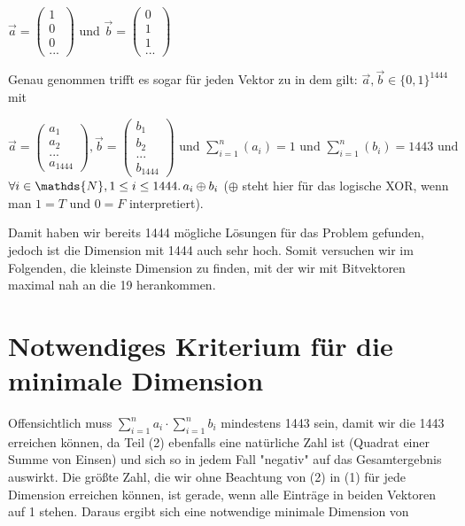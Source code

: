 \documentclass{article}
\newcommand{\sumN}[2]{\ensuremath{\sum\limits_{#1}^{#2}}}
\newcommand{\inN}[1]{\ensuremath{#1 \in \mathds{N}}}
\newcommand{\faExp}[2]{\ensuremath{\forall #1 \ldotp #2}}
\begin{document}
$\vec a = \begin{pmatrix}1\\0\\0\\...\end{pmatrix}$ und $\vec b = \begin{pmatrix}0\\1\\1\\...\end{pmatrix}$

Genau genommen trifft es sogar für jeden Vektor zu in dem gilt: $\vec a,\vec b \in \{0,1\}^{1444}$ mit

$\vec a = \begin{pmatrix}a_1\\a_2\\...\\a_{1444}\end{pmatrix}, \vec b = \begin{pmatrix}b_1\\b_2\\...\\b_{1444}\end{pmatrix} \text{ und } \sumN{i=1}{n}(a_i) = 1 \text{ und } \sumN{i=1}{n}(b_i) = 1443 \text{ und }$\\ $\faExp{\inN{i}, 1\leq i \leq 1444}{a_i \oplus b_i}$ ($\oplus$ steht hier für das logische XOR, wenn man $1=T$ und $0=F$ interpretiert).

Damit haben wir bereits 1444 mögliche Lösungen für das Problem gefunden, jedoch ist die Dimension mit 1444 auch sehr hoch. Somit versuchen wir im Folgenden, die kleinste Dimension zu finden, mit der wir mit Bitvektoren maximal nah an die 19 herankommen.

\section{Notwendiges Kriterium für die minimale Dimension}

Offensichtlich muss $\sumN{i=1}{n}a_i \cdot \sumN{i=1}{n}b_i$ mindestens 1443 sein, damit wir die 1443 erreichen können, da Teil (2) ebenfalls eine natürliche Zahl ist (Quadrat einer Summe von Einsen) und sich so in jedem Fall "negativ" auf das Gesamtergebnis auswirkt. Die größte Zahl, die wir ohne Beachtung von (2) in (1) für jede Dimension erreichen können, ist gerade, wenn alle Einträge in beiden Vektoren auf 1 stehen. Daraus ergibt sich eine notwendige minimale Dimension von
\end{document}

